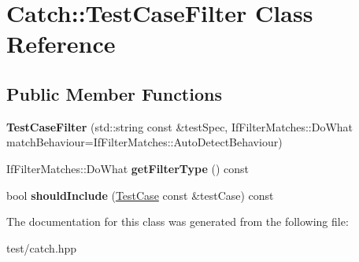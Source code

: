 \hypertarget{classCatch_1_1TestCaseFilter}{}\section{Catch\+:\+:Test\+Case\+Filter Class Reference}
\label{classCatch_1_1TestCaseFilter}
\subsection*{Public Member Functions}
\begin{DoxyCompactItemize}
\item 
{\bfseries Test\+Case\+Filter} (std\+::string const \&test\+Spec, If\+Filter\+Matches\+::\+Do\+What match\+Behaviour=If\+Filter\+Matches\+::\+Auto\+Detect\+Behaviour)\hypertarget{classCatch_1_1TestCaseFilter_a834f4aaf94f6d4dab0c43db2425e533b}{}\label{classCatch_1_1TestCaseFilter_a834f4aaf94f6d4dab0c43db2425e533b}

\item 
If\+Filter\+Matches\+::\+Do\+What {\bfseries get\+Filter\+Type} () const \hypertarget{classCatch_1_1TestCaseFilter_a27d4b3e5d04034f2bcbb1f070fb55412}{}\label{classCatch_1_1TestCaseFilter_a27d4b3e5d04034f2bcbb1f070fb55412}

\item 
bool {\bfseries should\+Include} (\hyperlink{classCatch_1_1TestCase}{Test\+Case} const \&test\+Case) const \hypertarget{classCatch_1_1TestCaseFilter_a4af367b82ecf4f14d52ad969dcdf0364}{}\label{classCatch_1_1TestCaseFilter_a4af367b82ecf4f14d52ad969dcdf0364}

\end{DoxyCompactItemize}


The documentation for this class was generated from the following file\+:\begin{DoxyCompactItemize}
\item 
test/catch.\+hpp\end{DoxyCompactItemize}
